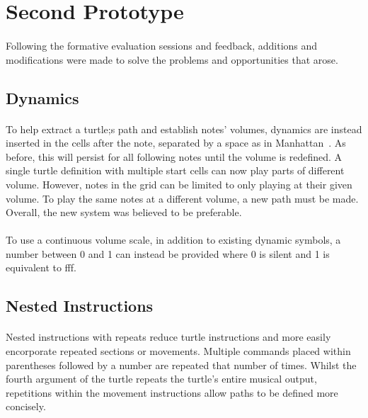 \section{Second Prototype}

\paragraph{} Following the formative evaluation sessions and feedback, additions and modifications were made to solve the problems and opportunities that arose.

\subsection{Dynamics}

\paragraph{} To help extract a turtle;s path and establish notes' volumes, dynamics are instead inserted in the cells after the note, separated by a space as in Manhattan~\cite{nash:manhattan}. As before, this will persist for all following notes until the volume is redefined. A single turtle definition with multiple start cells can now play parts of different volume. However, notes in the grid can be limited to only playing at their given volume. To play the same notes at a different volume, a new path must be made. Overall, the new system was believed to be preferable.

\paragraph{} To use a continuous volume scale, in addition to existing dynamic symbols, a number between 0 and 1 can instead be provided where 0 is silent and 1 is equivalent to fff.

\subsection{Nested Instructions}

\paragraph{} Nested instructions with repeats reduce turtle instructions and more easily encorporate repeated sections or movements. Multiple commands placed within parentheses followed by a number are repeated that number of times. Whilst the fourth argument of the turtle repeats the turtle's entire musical output, repetitions within the movement instructions allow paths to be defined more concisely.

